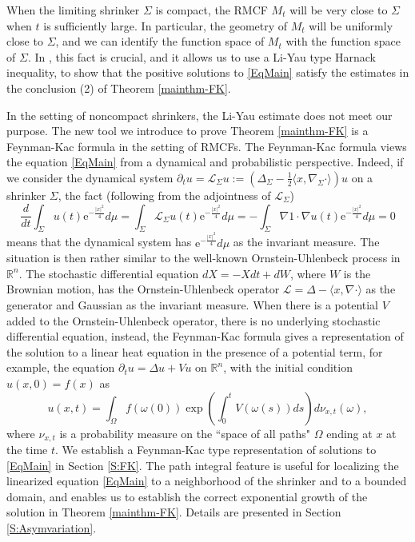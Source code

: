 \documentclass[12pt]{amsart}
\numberwithin{equation}{section}
\numberwithin{equation}{section}
\newcommand{\R}{\mathbb{R}}
\begin{document}
	When the limiting shrinker $\Sigma$ is compact, the RMCF $M_t$ will be very close to $\Sigma$ when $t$ is sufficiently large. In particular, the geometry of $M_t$ will be uniformly close to $\Sigma$, and we can identify the function space of $M_t$ with the function space of $\Sigma$. In \cite{SX}, this fact is crucial, and it allows us to use a Li-Yau type Harnack inequality, to show that the positive solutions to \eqref{EqMain} satisfy the estimates in the conclusion (2) of Theorem \ref{mainthm-FK}.
	
	In the setting of noncompact shrinkers, the Li-Yau estimate does not meet our purpose. The new tool we introduce to prove Theorem \ref{mainthm-FK} is a Feynman-Kac formula in the setting of RMCFs. The Feynman-Kac formula views the equation \eqref{EqMain} from a dynamical and probabilistic perspective.  Indeed, if we consider the dynamical system $\partial_t u=\mathcal L_\Sigma u:=(\Delta_\Sigma-\frac12\langle x,\nabla_\Sigma\cdot \rangle)u$ on a shrinker $\Sigma$, the fact (following from the adjointness of $\mathcal L_\Sigma$)$$\frac{d}{dt}\int_{\Sigma}u(t)\mathrm{e}^{-\frac{|x|^2}{4}}d\mu=\int_{\Sigma}\mathcal L_\Sigma u(t)\mathrm{e}^{-\frac{|x|^2}{4}}d\mu=-\int_{\Sigma}\nabla 1\cdot \nabla u(t)\mathrm{e}^{-\frac{|x|^2}{4}}d\mu=0$$
	means that the dynamical system has $\mathrm{e}^{-\frac{|x|^2}{4}}d\mu$ as the invariant measure. The situation is then rather similar to the well-known Ornstein-Uhlenbeck process in $\R^n$. The stochastic differential equation $dX=-Xdt+dW$, where $W$ is the Brownian motion, has the Ornstein-Uhlenbeck operator $\mathcal L=\Delta-\langle x,\nabla\cdot \rangle$ as the generator and Gaussian as the invariant measure. When there is a potential $V$ added to the Ornstein-Uhlenbeck operator, there is no underlying stochastic differential equation, instead, the Feynman-Kac formula gives a representation of  the solution to a linear heat equation in the presence of a potential term, for example, the equation $\partial_t u=\Delta u+Vu$ on $\R^n$, with the initial condition $u(x,0)=f(x)$ as
	\[
	u(x,t)=\int_\Omega f(\omega(0))\exp\left(\int_0^t V(\omega(s))ds\right)d\nu_{x,t}(\omega),
	\]
	where  $\nu_{x,t}$ is a  probability measure on the ``space of all paths" $\Omega$ ending at $x$ at the time $t$. We establish a Feynman-Kac type representation of solutions to \eqref{EqMain} in Section \ref{S:FK}. 
	The path integral feature is useful for localizing the linearized equation \eqref{EqMain} to a neighborhood of the shrinker and to a bounded domain, and enables us to establish the correct exponential growth of the solution in Theorem \ref{mainthm-FK}. Details are presented in Section \ref{S:Asymvariation}. 
	
\end{document}
